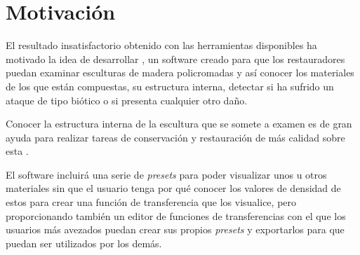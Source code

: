 \section{Motivación}

El resultado insatisfactorio obtenido con las herramientas disponibles ha motivado la idea de desarrollar \myTitle, un software creado para que los restauradores puedan examinar esculturas de madera policromadas y así conocer los materiales de los que están compuestas, su estructura interna, detectar si ha sufrido un ataque de tipo biótico o si presenta cualquier otro daño.

Conocer la estructura interna de la escultura que se somete a examen es de gran ayuda para realizar tareas de conservación y restauración de más calidad sobre esta \cite{tc_esculturas}.

El software incluirá una serie de \textit{presets} para poder visualizar unos u otros materiales sin que el usuario tenga por qué conocer los valores de densidad de estos para crear una función de transferencia que los visualice, pero proporcionando también un editor de funciones de transferencias con el que los usuarios más avezados puedan crear sus propios \textit{presets} y exportarlos para que puedan ser utilizados por los demás.
